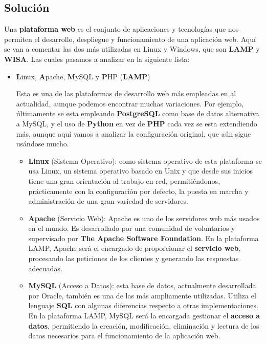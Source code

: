 \subsection{Solución}

Una \textbf{plataforma web} es el conjunto de aplicaciones y tecnologías que nos permiten el desarrollo, despliegue y funcionamiento de una aplicación web. Aquí se van a comentar las dos más utilizadas en Linux y Windows, que son \textbf{LAMP} y \textbf{WISA}. Las cuales pasamos a analizar en la siguiente lista:

\begin{itemize}
    \item \textbf{L}inux, \textbf{A}pache, \textbf{M}ySQL y \textbf{P}HP (\textbf{LAMP})

    Esta es una de las plataformas de desarrollo web más empleadas en al actualidad, aunque podemos encontrar muchas variaciones. Por ejemplo, últimamente se esta empleando \textbf{PostgreSQL} como base de datos alternativa a MySQL, y el uso de \textbf{Python} en vez de \textbf{PHP} cada vez se esta extendiendo más, aunque aquí vamos a analizar la configuración original, que aún sigue usándose mucho.

    \begin{itemize}
        \item \textbf{Linux} (Sistema Operativo): como sistema operativo de esta plataforma se usa Linux, un sistema operativo basado en Unix y que desde sus inicios tiene una gran orientación al trabajo en red, permitiéndonos, prácticamente con la configuración por defecto, la puesta en marcha y administración de una gran variedad de servidores.

        \item \textbf{Apache} (Servicio Web): Apache es uno de los servidores web más usados en el mundo. Es desarrollado por una comunidad de voluntarios y supervisado por \textbf{The Apache Software Foundation}. En la plataforma LAMP, Apache será el encargado de proporcionar el \textbf{servicio web}, procesando las peticiones de los clientes y generando las respuestas adecuadas.

        \item \textbf{MySQL} (Acceso a Datos): esta base de datos, actualmente desarrollada por Oracle, también es una de las más ampliamente utilizadas. Utiliza el lenguaje \textbf{SQL} con algunas diferencias respecto a otras implementaciones. En la plataforma LAMP, MySQL será la encargada gestionar el \textbf{acceso a datos}, permitiendo la creación, modificación, eliminación y lectura de los datos necesarios para el funcionamiento de la aplicación web.


\end{itemize}
\end{itemize}
